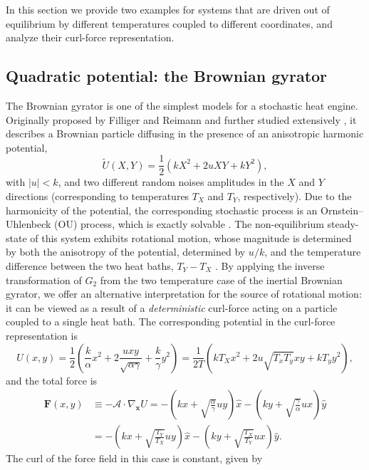 In this section we provide two examples for systems that are driven out of equilibrium by different temperatures coupled to different coordinates, and analyze their curl-force representation.

\subsection{Quadratic potential: the Brownian gyrator} 
The Brownian gyrator is one of the simplest models for a stochastic heat engine. Originally proposed by Filliger and Reimann \cite{filliger2007brownian} and further studied extensively \cite{dotsenko2013two, mancois2018two, bae2021inertial, baldassarri2020engineered, cerasoli2018asymmetry, cerasoli2022spectral, argun2017experimental, martins2026role, chang2021autonomous, dos2021stationary, movilla2021energy, pietzonka2018universal, lin2022stochastic, abdoli2022tunable, chiang2017electrical}, it describes a Brownian particle diffusing in the presence of an anisotropic harmonic potential,
\begin{equation}\tilde{U}(X, Y) = \frac{1}{2}\left( kX^2 + 2uXY + kY^2 \right),\end{equation}
with $|u|<k$, and two different random noises amplitudes in the $X$ and $Y$ directions (corresponding to temperatures $T_X$ and $T_Y$, respectively).  
Due to the harmonicity of the potential, the corresponding stochastic process is an Ornstein–Uhlenbeck (OU) process, which is exactly solvable \cite{risken1996fokker}. The non-equilibrium steady-state of this system exhibits rotational motion, whose magnitude is determined by both the anisotropy of the potential, determined by $u/k$, and the temperature difference between the two heat baths, $T_Y-T_X$ \cite{mancois2018two, bae2021inertial}. By applying the inverse transformation of $G_2$ from the two temperature case of the inertial Brownian gyrator, we offer an alternative interpretation for the source of rotational motion: it can be viewed as a result of a \emph{deterministic} curl-force acting on a particle coupled to a single heat bath. The corresponding potential in the curl-force representation is
\begin{equation}
    U(x, y) = \frac{1}{2}\left( \frac{k}{\alpha}x^2 + 2\frac{u xy}{\sqrt{\alpha \gamma}} + \frac{k}{\gamma}y^2 \right) = \frac{1}{2T}\left( {kT_X}x^2+2{u\sqrt{T_x T_y}xy}+kT_yy^2 \right),
\end{equation}
and the total force is \begin{align}
\mathbf{F}(x, y) &\equiv -\mathcal{A}\cdot\nabla_\mathbf{x} U =-(kx+\sqrt{\frac{\alpha}{\gamma}} uy)\hat{x}-(ky+\sqrt{\frac{\gamma}{\alpha}} ux)\hat{y} \\
&=-(kx+\sqrt{\frac{T_Y}{T_X}} uy)\hat{x}-(ky+\sqrt{\frac{T_X}{T_Y}} ux)\hat{y}. \nonumber
\end{align} The curl of the force field in this case is constant, given by 

